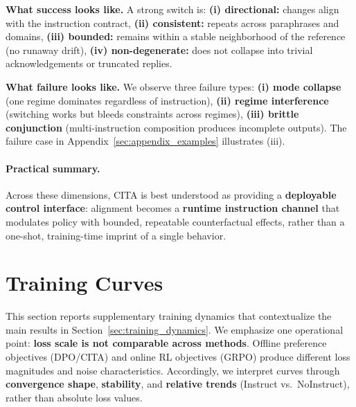 \vspace{-0.15em}
\noindent
\textbf{What success looks like.}
A strong switch is:
\textbf{(i) directional:} changes align with the instruction contract,
\textbf{(ii) consistent:} repeats across paraphrases and domains,
\textbf{(iii) bounded:} remains within a stable neighborhood of the reference (no runaway drift),
\textbf{(iv) non-degenerate:} does not collapse into trivial acknowledgements or truncated replies.

\vspace{-0.15em}
\noindent
\textbf{What failure looks like.}
We observe three failure types:
\textbf{(i) mode collapse} (one regime dominates regardless of instruction),
\textbf{(ii) regime interference} (switching works but bleeds constraints across regimes),
\textbf{(iii) brittle conjunction} (multi-instruction composition produces incomplete outputs).
The failure case in Appendix~\ref{sec:appendix_examples} illustrates (iii).

\vspace{-0.15em}
\paragraph{\textbf{Practical summary.}}
Across these dimensions, \textsc{CITA} is best understood as providing a \textbf{deployable control interface}:
alignment becomes a \textbf{runtime instruction channel} that modulates policy with bounded, repeatable counterfactual effects,
rather than a one-shot, training-time imprint of a single behavior.

\section{Training Curves}
\label{sec:appendix_training_curves}

\vspace{-0.25em}
\noindent
This section reports supplementary training dynamics that contextualize the main results in Section~\ref{sec:training_dynamics}.
We emphasize one operational point: \textbf{loss scale is not comparable across methods}.
Offline preference objectives (DPO/\textsc{CITA}) and online RL objectives (GRPO) produce different loss magnitudes and noise characteristics.
Accordingly, we interpret curves through \textbf{convergence shape}, \textbf{stability}, and \textbf{relative trends} (Instruct vs.\ NoInstruct), rather than absolute loss values.

